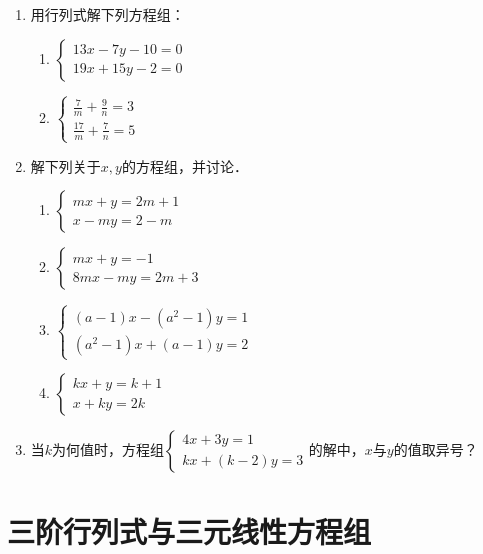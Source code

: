 \begin{enumerate}
\item 用行列式解下列方程组：
\begin{multicols}{2}
\begin{enumerate}
    \item $\begin{cases}
        13x-7y-10=0\\19x+15y-2=0
    \end{cases}$
    \item $\begin{cases}
        \frac{7}{m}+\frac{9}{n}=3\\
        \frac{17}{m}+\frac{7}{n}=5
    \end{cases}$
\end{enumerate}
\end{multicols}
\item 解下列关于$x,y$的方程组，并讨论．
\begin{multicols}{2}
\begin{enumerate}
    \item $\begin{cases}
        mx+y=2m+1\\x-my=2-m
    \end{cases}$
    \item $\begin{cases}
        mx+y=-1\\8mx-my=2m+3
    \end{cases}$
    \item $\begin{cases}
        (a-1)x-(a^2-1)y=1\\
        (a^2-1)x+(a-1)y=2
    \end{cases}$
    \item $\begin{cases}
        kx+y=k+1\\
        x+ky=2k
    \end{cases}$
\end{enumerate}    
\end{multicols}

\item 当$k$为何值时，方程组$\begin{cases}
    4x+3y=1\\kx+(k-2)y=3
\end{cases}$的解中，$x$与$y$的值取异号？
\end{enumerate}

\section{三阶行列式与三元线性方程组}
